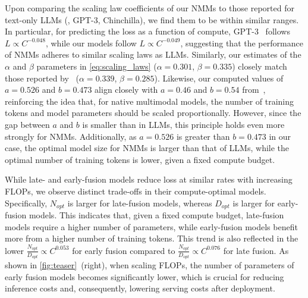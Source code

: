 \begin{figure}[t!]
    \begin{minipage}[t]{0.48\textwidth}
        
    \end{minipage}        
    \hfill
    \begin{minipage}[t]{0.48\textwidth}
        
    \end{minipage}
\end{figure}



Upon comparing the scaling law coefficients of our NMMs to those reported for
text-only LLMs (\eg, GPT-3, Chinchilla), we find them to be within similar
ranges. In particular, for predicting the loss as a function of compute,
GPT-3~\citep{brown2020language} follows $L \propto C^{-0.048}$, while our models
follow $L \propto C^{-0.049}$, suggesting that the performance of NMMs adheres
to similar scaling laws as LLMs.  
Similarly, our estimates of the $\alpha$ and $\beta$ parameters in
\cref{eq:scaling_laws} ($\alpha=0.301$, $\beta=0.335$) closely match those
reported by~\citet{hoffmann2022training} ($\alpha=0.339$, $\beta=0.285$).
Likewise, our computed values of $a=0.526$ and $b=0.473$ align closely with
$a=0.46$ and $b=0.54$ from~\citet{hoffmann2022training}, reinforcing the idea
that, for native multimodal models, the number of training tokens and model
parameters should be scaled proportionally.  
However, since the gap between $a$ and $b$ is smaller than in LLMs, this
principle holds even more strongly for NMMs. Additionally, as $a=0.526$ is
greater than $b=0.473$ in our case, the optimal model size for NMMs is larger
than that of LLMs, while the optimal number of training tokens is lower, given
a fixed compute budget. 



While late- and early-fusion models reduce loss at similar rates with increasing
FLOPs, we observe distinct trade-offs in their compute-optimal models.
Specifically, $N_{opt}$ is larger for late-fusion models, whereas $D_{opt}$ is
larger for early-fusion models. This indicates that, given a fixed compute
budget, late-fusion models require a higher number of parameters, while early-fusion
models benefit more from a higher number of training tokens.  
This trend is also reflected in the lower $\frac{N_{opt}}{D_{opt}} \propto
C^{0.053}$ for early fusion compared to $\frac{N_{opt}}{D_{opt}} \propto
C^{0.076}$ for late fusion. As shown in \cref{fig:teaser}~(right), when scaling FLOPs,
the number of parameters of early fusion models becomes significantly lower, which is crucial
for reducing inference costs and, consequently, lowering serving costs after
deployment.  


